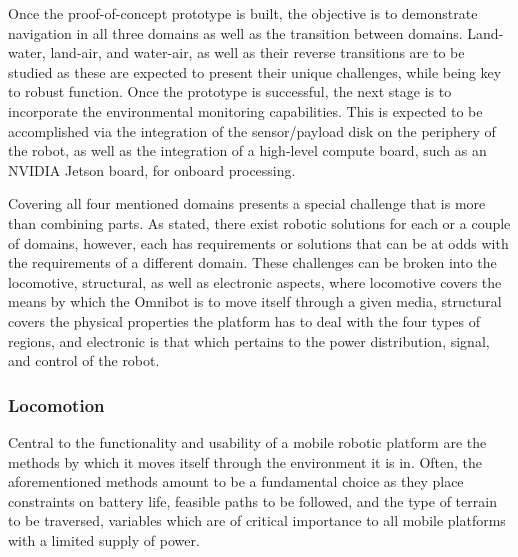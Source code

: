 Once the proof-of-concept prototype is built, the objective is to demonstrate navigation in all three domains as well as the transition between domains. Land-water, land-air, and water-air, as well as their reverse transitions are to be studied as these are expected to present their unique challenges, while being key to robust function. Once the prototype is successful, the next stage is to incorporate the environmental monitoring capabilities. This is expected to be accomplished via the integration of the sensor/payload disk on the periphery of the robot, as well as the integration of a high-level compute board, such as an NVIDIA Jetson board, for onboard processing. %


Covering all four mentioned domains presents a special challenge that is more than combining parts. As stated, there exist robotic solutions for each or a couple of domains, however, each has requirements or solutions that can be at odds with the requirements of a different domain. These challenges can be broken into the locomotive, structural, as well as electronic aspects, where locomotive covers the means by which the Omnibot is to move itself through a given media, structural covers the physical properties the platform has to deal with the four types of regions, and electronic is that which pertains to the power distribution, signal, and control of the robot. 
  
\subsubsection{Locomotion}

Central to the functionality and usability of a mobile robotic platform are the methods by which it moves itself through the environment it is in. Often, the aforementioned methods amount to be a fundamental choice as they place constraints on battery life, feasible paths to be followed, and the type of terrain to be traversed, variables which are of critical importance to all mobile platforms with a limited supply of power. 


